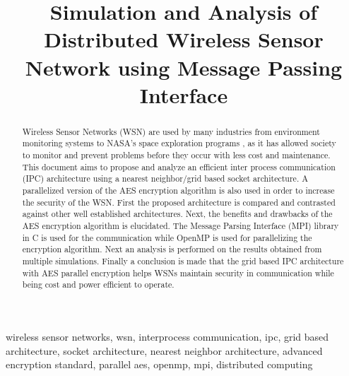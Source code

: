 \documentclass[conference]{IEEEtran}
\begin{document}
	
	\title{Simulation and Analysis of Distributed Wireless Sensor Network using Message Passing Interface }
	
	\author{
	}
	\maketitle
	
	\begin{abstract}
		Wireless Sensor Networks (WSN) are used by many industries from environment monitoring systems \cite{othman2012wireless} to NASA's space exploration programs \cite{barton2015space}, as it has allowed society to monitor and prevent problems before they occur with less cost and maintenance. This document aims to propose and analyze an efficient inter process communication (IPC) architecture using a nearest neighbor/grid based socket architecture. A parallelized version of the AES encryption algorithm is also used in order to increase the security of the WSN. First the proposed architecture is compared and contrasted against other well established architectures. Next, the benefits and drawbacks of the AES encryption algorithm is elucidated. The Message Parsing Interface (MPI) library in C \cite{openmpi} is used for the communication while OpenMP \cite{openmp_2018} is used for parallelizing the encryption algorithm. Next an analysis is performed on the results obtained from multiple simulations. Finally a conclusion is made that the grid based IPC architecture with AES parallel encryption helps WSNs maintain security in communication while being cost and power efficient to operate.

	\end{abstract}

	
	\begin{IEEEkeywords}
	wireless sensor networks, wsn, interprocess communication, ipc, grid based architecture, socket architecture, nearest neighbor architecture, advanced encryption standard, parallel aes, openmp, mpi, distributed computing
	\end{IEEEkeywords}
	
\end{document}
